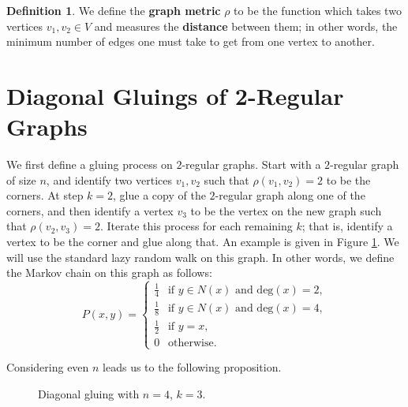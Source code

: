 \documentclass[10pt,a4paper]{amsart}
\theoremstyle{definition}
\newtheorem{definition}{Definition}
\numberwithin{definition}{section}
\begin{document}
\begin{definition}
We define the \textbf{graph metric} $\rho$ to be the function which takes two vertices $v_1, v_2 \in V$ and measures the \textbf{distance} between them; in other words, the minimum number of edges one must take to get from one vertex to another.
\end{definition}

\section{Diagonal Gluings of 2-Regular Graphs} \label{sec:two}

We first define a gluing process on $2$-regular graphs. Start with a $2$-regular graph of size $n$, and identify two vertices $v_1, v_2$ such that $\rho(v_1, v_2) = 2$ to be the corners. At step $k=2$, glue a copy of the $2$-regular graph along one of the corners, and then identify a vertex $v_3$ to be the vertex on the new graph such that $\rho(v_2, v_3) = 2$. Iterate this process for each remaining $k$; that is, identify a vertex to be the corner and glue along that. An example is given in Figure \ref{fig:graph1}. We will use the standard lazy random walk on this graph. In other words, we define the Markov chain on this graph as follows: 
\[ P(x,y) = \begin{cases} \frac{1}{4} \ \ \text{ if } y \in N(x) \text{ and } \text{deg}(x) = 2, \\
\frac{1}{8} \ \ \text{ if } y \in N(x) \text{ and } \text{deg}(x) = 4, \\
\frac{1}{2} \ \ \text{ if } y = x,\\
0 \ \ \text{ otherwise.} 
\end{cases}\]

\noindent Considering even $n$ leads us to the following proposition.

\begin{figure}

\begin{center}
\end{center}
\caption{Diagonal gluing with $n=4$, $k=3$.}
\label{fig:graph1}
\end{figure}
\end{document}
